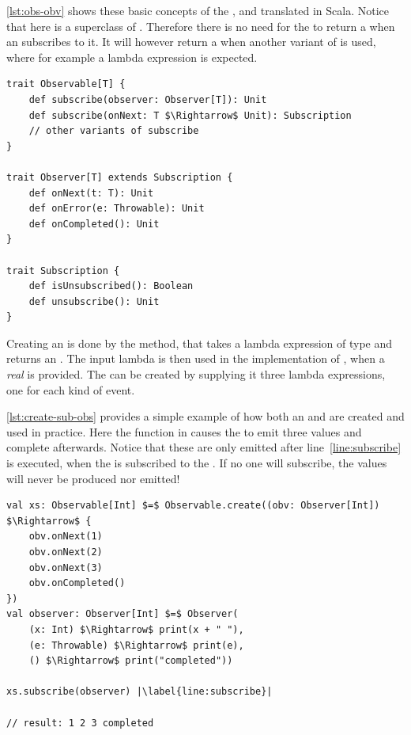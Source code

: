 \autoref{lst:obs-obv} shows these basic concepts of the \obs, \obv and \subs translated in Scala. Notice that here \subs is a superclass of \obv. Therefore there is no need for the \obs to return a \subs when an \obv subscribes to it. It will however return a \subs when another variant of  is used, where for example a lambda expression is expected.

\begin{minipage}{\linewidth}
\begin{lstlisting}[style=ScalaStyle, caption={Observable, Observer and Subscription}, label={lst:obs-obv}]
trait Observable[T] {
    def subscribe(observer: Observer[T]): Unit
    def subscribe(onNext: T $\Rightarrow$ Unit): Subscription
    // other variants of subscribe
}

trait Observer[T] extends Subscription {
    def onNext(t: T): Unit
    def onError(e: Throwable): Unit
    def onCompleted(): Unit
}

trait Subscription {
    def isUnsubscribed(): Boolean
    def unsubscribe(): Unit
}
\end{lstlisting}
\end{minipage}

Creating an \obs is done by the  method, that takes a lambda expression of type  and returns an \obs. The input lambda is then used in the implementation of , when a \emph{real} \obv is provided. The \obv can be created by supplying it three lambda expressions, one for each kind of event.

\autoref{lst:create-sub-obs} provides a simple example of how both an \obs and \obv are created and used in practice. Here the function in  causes the \obs to emit three values and complete afterwards. Notice that these are only emitted after line~\ref{line:subscribe} is executed, when the \obv is subscribed to the \obs. If no one will subscribe, the values will never be produced nor emitted!

\begin{minipage}{\linewidth}
\begin{lstlisting}[style=ScalaStyle, caption={Creating and subscribing to an \obs}, label={lst:create-sub-obs}]
val xs: Observable[Int] $=$ Observable.create((obv: Observer[Int]) $\Rightarrow$ {
    obv.onNext(1)
    obv.onNext(2)
    obv.onNext(3)
    obv.onCompleted()
})
val observer: Observer[Int] $=$ Observer(
    (x: Int) $\Rightarrow$ print(x + " "),
    (e: Throwable) $\Rightarrow$ print(e),
    () $\Rightarrow$ print("completed"))

xs.subscribe(observer) |\label{line:subscribe}|

// result: 1 2 3 completed
\end{lstlisting}
\end{minipage}

